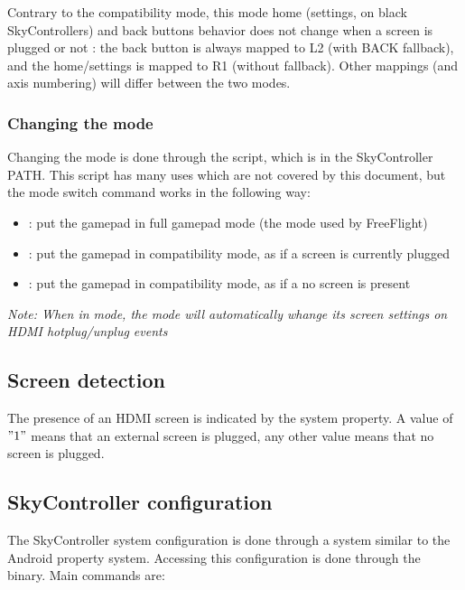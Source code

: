 Contrary to the compatibility mode, this mode home (settings, on black SkyControllers) and back buttons behavior does not change when a screen is plugged or not : the back button is always mapped to L2 (with BACK fallback), and the home/settings is mapped to R1 (without fallback). Other mappings (and axis numbering) will differ between the two modes.

\subsubsection{Changing the mode}

Changing the mode is done through the  script, which is in the SkyController PATH. This script has many uses which are not covered by this document, but the mode switch command works in the following way:

\begin{itemize}
\item {} : put the gamepad in full gamepad mode (the mode used by FreeFlight)
\item {} : put the gamepad in compatibility mode, as if a screen is currently plugged
\item {} : put the gamepad in compatibility mode, as if a no screen is present
\end{itemize}

\emph{Note: When in  mode, the mode will automatically whange its screen settings on HDMI hotplug/unplug events}

\subsection{Screen detection}

The presence of an HDMI screen is indicated by the  system property. A value of $"1"$ means that an external screen is plugged, any other value means that no screen is plugged.

\newpage
\subsection{SkyController configuration}

The SkyController system configuration is done through a system similar to the Android property system. Accessing this configuration is done through the  binary. Main commands are:

